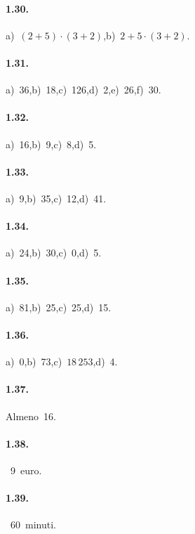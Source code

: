 \paragraph{1.30.}
a)~$ (2+5)\cdot(3+2) $,\quad b)~$ 2+5\cdot(3+2) $.

\paragraph{1.31.}
a)~36,\quad b)~18,\quad c)~126,\quad d)~2,\quad e)~26,\quad f)~30.

\paragraph{1.32.}
a)~16,\quad b)~9,\quad c)~8,\quad d)~5.

\paragraph{1.33.}
a)~9,\quad b)~35,\quad c)~12,\quad d)~41.

\paragraph{1.34.}
a)~24,\quad b)~30,\quad c)~0,\quad d)~5.

\paragraph{1.35.}
a)~81,\quad b)~25,\quad c)~25,\quad d)~15.

\paragraph{1.36.}
a)~0,\quad b)~73,\quad c)~$18\,253$,\quad d)~4.
\begin{multicols}{3}
\paragraph{1.37.}
Almeno~16.

\paragraph{1.38.}~9~euro.

\paragraph{1.39.}~60~minuti.
\end{multicols}
